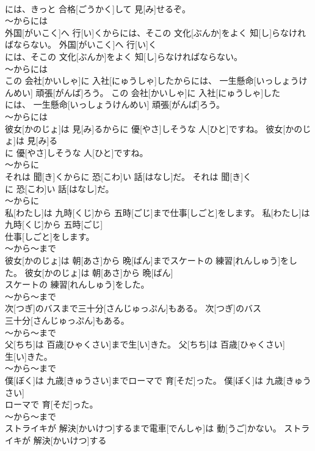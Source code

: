 \documentclass[8pt]{extreport}
\begin{document}
\begin{CJK}{UTF8}{min}
\\	には、きっと 合格[ごうかく]して 見[み]せるぞ。	
\\	～からには
\\	外国[がいこく]へ 行[い]くからには、そこの 文化[ぶんか]をよく 知[し]らなければならない。	外国[がいこく]へ 行[い]く
\\	には、そこの 文化[ぶんか]をよく 知[し]らなければならない。	
\\	～からには
\\	この 会社[かいしゃ]に 入社[にゅうしゃ]したからには、 一生懸命[いっしょうけんめい] 頑張[がんば]ろう。	この 会社[かいしゃ]に 入社[にゅうしゃ]した
\\	には、 一生懸命[いっしょうけんめい] 頑張[がんば]ろう。	
\\	～からには
\\	彼女[かのじょ]は 見[み]るからに 優[やさ]しそうな 人[ひと]ですね。	彼女[かのじょ]は 見[み]る
\\	に 優[やさ]しそうな 人[ひと]ですね。	
\\	～からに
\\	それは 聞[き]くからに 恐[こわ]い 話[はなし]だ。	それは 聞[き]く
\\	に 恐[こわ]い 話[はなし]だ。	
\\	～からに
\\	私[わたし]は 九時[くじ]から 五時[ごじ]まで仕事[しごと]をします。	私[わたし]は 九時[くじ]から 五時[ごじ]
\\	仕事[しごと]をします。	
\\	～から～まで
\\	彼女[かのじょ]は 朝[あさ]から 晩[ばん]までスケートの 練習[れんしゅう]をした。	彼女[かのじょ]は 朝[あさ]から 晩[ばん]
\\	スケートの 練習[れんしゅう]をした。	
\\	～から～まで
\\	次[つぎ]のバスまで三十分[さんじゅっぷん]もある。	次[つぎ]のバス
\\	三十分[さんじゅっぷん]もある。	
\\	～から～まで
\\	父[ちち]は 百歳[ひゃくさい]まで生[い]きた。	父[ちち]は 百歳[ひゃくさい]
\\	生[い]きた。	
\\	～から～まで
\\	僕[ぼく]は 九歳[きゅうさい]までローマで 育[そだ]った。	僕[ぼく]は 九歳[きゅうさい]
\\	ローマで 育[そだ]った。	
\\	～から～まで
\\	ストライキが 解決[かいけつ]するまで電車[でんしゃ]は 動[うご]かない。	ストライキが 解決[かいけつ]する

\end{CJK}
\end{document}
